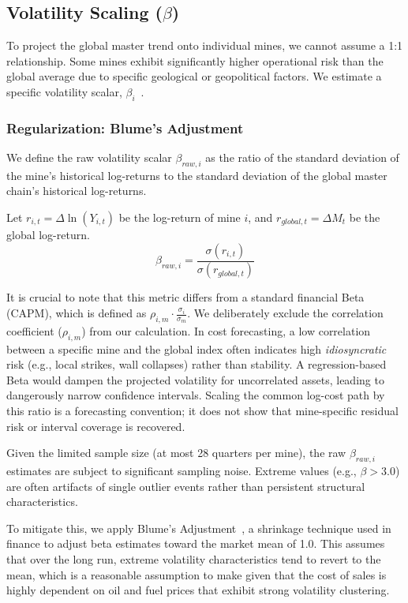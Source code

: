 \subsection{Volatility Scaling (\texorpdfstring{$\beta$}{beta})}
To project the global master trend onto individual mines, we cannot assume a 1:1 relationship. Some mines exhibit significantly higher operational risk than the global average due to specific geological or geopolitical factors. We estimate a specific volatility scalar, $\beta_i$~\cite{PoonGranger2003}.
\subsubsection{Regularization: Blume's Adjustment }
We define the raw volatility scalar $\beta_{raw,i}$ as the ratio of the standard deviation of the mine's historical log-returns to the standard deviation of the global master chain's historical log-returns.

Let $r_{i,t} = \Delta \ln(Y_{i,t})$ be the log-return of mine $i$, and $r_{global,t} = \Delta M_t$ be the global log-return.
\[
\beta_{raw,i} = \frac{\sigma(r_{i,t})}{\sigma(r_{global,t})}
\]

It is crucial to note that this metric differs from a standard financial Beta (CAPM), which is defined as $\rho_{i,m} \cdot \frac{\sigma_i}{\sigma_m}$. We deliberately exclude the correlation coefficient ($\rho_{i,m}$) from our calculation. In cost forecasting, a low correlation between a specific mine and the global index often indicates high \textit{idiosyncratic} risk (e.g., local strikes, wall collapses) rather than stability. A regression-based Beta would dampen the projected volatility for uncorrelated assets, leading to dangerously narrow confidence intervals. Scaling the common log-cost path by this ratio is a forecasting convention; it does not show that mine-specific residual risk or interval coverage is recovered.


Given the limited sample size (at most 28 quarters per mine), the raw $\beta_{raw,i}$ estimates are subject to significant sampling noise. Extreme values (e.g., $\beta > 3.0$) are often artifacts of single outlier events rather than persistent structural characteristics.

To mitigate this, we apply Blume's Adjustment~\cite{Blume1975}, a shrinkage technique used in finance to adjust beta estimates toward the market mean of 1.0. This assumes that over the long run, extreme volatility characteristics tend to revert to the mean, which is a reasonable assumption to make given that the cost of sales is highly dependent on oil and fuel prices that exhibit strong volatility clustering.


